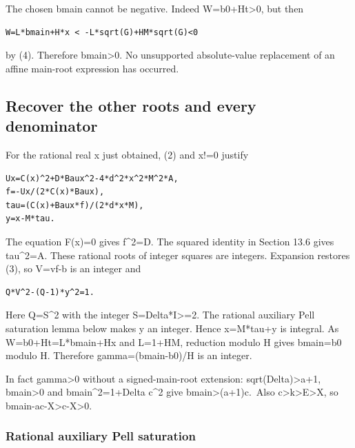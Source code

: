 \documentclass[
  10pt,
]{article}
\begin{document}
The chosen bmain cannot be negative. Indeed W=b0+Ht\textgreater0, but
then

\begin{verbatim}
W=L*bmain+H*x < -L*sqrt(G)+HM*sqrt(G)<0
\end{verbatim}

by (4). Therefore bmain\textgreater0. No unsupported absolute-value
replacement of an affine main-root expression has occurred.

\subsection{Recover the other roots and every
denominator}\label{recover-the-other-roots-and-every-denominator}

For the rational real x just obtained, (2) and x!=0 justify

\begin{verbatim}
Ux=C(x)^2+D*Baux^2-4*d^2*x^2*M^2*A,
f=-Ux/(2*C(x)*Baux),
tau=(C(x)+Baux*f)/(2*d*x*M),
y=x-M*tau.
\end{verbatim}

The equation F(x)=0 gives f\^{}2=D. The squared identity in Section 13.6
gives tau\^{}2=A. These rational roots of integer squares are integers.
Expansion restores (3), so V=vf-b is an integer and

\begin{verbatim}
Q*V^2-(Q-1)*y^2=1.
\end{verbatim}

Here Q=S\^{}2 with the integer S=Delta*I\textgreater=2. The rational
auxiliary Pell saturation lemma below makes y an integer. Hence
x=M*tau+y is integral. As W=b0+Ht=L*bmain+Hx and L=1+HM, reduction
modulo H gives bmain=b0 modulo H. Therefore gamma=(bmain-b0)/H is an
integer.

In fact gamma\textgreater0 without a signed-main-root extension:
sqrt(Delta)\textgreater a+1, bmain\textgreater0 and bmain\^{}2=1+Delta
c\^{}2 give bmain\textgreater(a+1)c.~Also
c\textgreater k\textgreater E\textgreater X, so
bmain-ac-X\textgreater c-X\textgreater0.

\subsubsection{Rational auxiliary Pell
saturation}\label{rational-auxiliary-pell-saturation}
\end{document}
